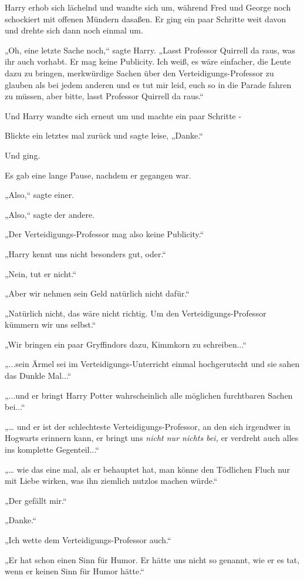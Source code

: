 {Harry erhob sich lächelnd und wandte sich um, während Fred und George noch schockiert mit offenen Mündern dasaßen. Er ging ein paar Schritte weit davon und drehte sich dann noch einmal um.

„Oh, eine letzte Sache noch,“ sagte Harry. „Lasst Professor Quirrell da raus, was ihr auch vorhabt. Er mag keine Publicity. Ich weiß, es wäre einfacher, die Leute dazu zu bringen, merkwürdige Sachen über den Verteidigungs-Professor zu glauben als bei jedem anderen und es tut mir leid, euch so in die Parade fahren zu müssen, aber bitte, lasst Professor Quirrell da raus.“

Und Harry wandte sich erneut um und machte ein paar Schritte -

Blickte ein letztes mal zurück und sagte leise, „Danke.“

Und ging.

Es gab eine lange Pause, nachdem er gegangen war.

„Also,“ sagte einer.

„Also,“ sagte der andere.

„Der Verteidigungs-Professor mag also keine Publicity.“

„Harry kennt uns nicht besonders gut, oder.“

„Nein, tut er nicht.“

„Aber wir nehmen sein Geld natürlich nicht dafür.“

„Natürlich nicht, das wäre nicht richtig. Um den Verteidigungs-Professor kümmern wir uns selbst.“

„Wir bringen ein paar Gryffindors dazu, Kimmkorn zu schreiben...“

„...sein Ärmel sei im Verteidigungs-Unterricht einmal hochgerutscht und sie sahen das Dunkle Mal...“

„...und er bringt Harry Potter wahrscheinlich alle möglichen furchtbaren Sachen bei...“

„… und er ist der schlechteste Verteidigungs-Professor, an den sich irgendwer in Hogwarts erinnern kann, er bringt uns \emph{nicht nur nichts bei,} er verdreht auch alles ins komplette Gegenteil...“

„… wie das eine mal, als er behauptet hat, man könne den Tödlichen Fluch nur mit Liebe wirken, was ihn ziemlich nutzlos machen würde.“

„Der gefällt mir.“

„Danke.“

„Ich wette dem Verteidigungs-Professor auch.“

„Er hat schon einen Sinn für Humor. Er hätte uns nicht so genannt, wie er es tat, wenn er keinen Sinn für Humor hätte.“

}
